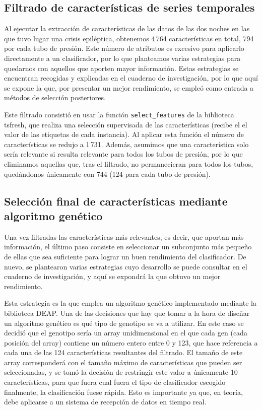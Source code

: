 \subsection{Filtrado de características de series temporales}

Al ejecutar la extracción de características de las datos de las dos noches en las que tuvo lugar una crisis epiléptica, obtenemos 4\,764 características en total, 794 por cada tubo de presión. Este número de atributos es excesivo para aplicarlo directamente a un clasificador, por lo que planteamos varias estrategias para quedarnos con aquellos que aporten mayor información. Estas estrategias se encuentran recogidas y explicadas en el cuaderno de investigación, por lo que aquí se expone la que, por presentar un mejor rendimiento, se empleó como entrada a métodos de selección posteriores. 

Este filtrado consistió en usar la función \texttt{select\_features} de la biblioteca tsfresh, que realiza una selección supervisada de las características (recibe el el valor de las etiquetas de cada instancia). Al aplicar esta función el número de características se redujo a 1\,731. Además, asumimos que una característica solo sería relevante si resulta relevante para todos los tubos de presión, por lo que eliminamos aquellas que, tras el filtrado, no permanecieran para todos los tubos, quedándonos únicamente con 744 (124 para cada tubo de presión).  

\subsection{Selección final de características mediante algoritmo genético}

Una vez filtradas las características más relevantes, es decir, que aportan más información, el último paso consiste en seleccionar un subconjunto más pequeño de ellas que sea suficiente para lograr un buen rendimiento del clasificador. De nuevo, se plantearon varias estrategias cuyo desarrollo se puede consultar en el cuaderno de investigación, y aquí se expondrá la que obtuvo un mejor rendimiento. 

Esta estrategia es la que emplea un algoritmo genético implementado mediante la biblioteca DEAP. Una de las decisiones que hay que tomar a la hora de diseñar un algoritmo genético es qué tipo de genotipo se va a utilizar. En este caso se decidió que el genotipo sería un array unidimensional en el que cada gen (cada posición del array) contiene un número entero entre 0 y 123, que hace referencia a cada una de las 124 características resultantes del filtrado. El tamaño de este array corresponderá con el tamaño máximo de características que pueden ser seleccionadas, y se tomó la decisión de restringir este valor a únicamente 10 características, para que fuera cual fuera el tipo de clasificador escogido finalmente, la clasificación fuese rápida. Esto es importante ya que, en teoría, debe aplicarse a un sistema de recepción de datos en tiempo real. 

